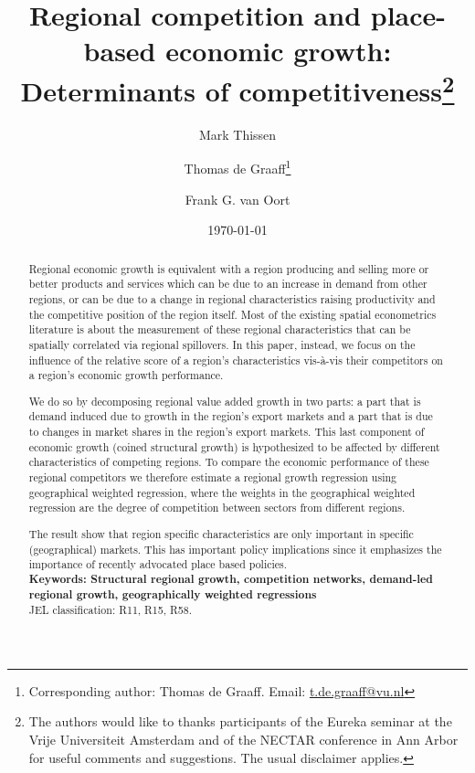 \documentclass[11pt,parskip,abstracton,notitlepage, paper=a4]{scrartcl}
\begin{document}
	
	\title{Regional competition and place-based economic growth: Determinants of competitiveness\thanks{The authors would like to thanks participants of the Eureka seminar at the Vrije Universiteit Amsterdam and of the NECTAR conference in Ann Arbor for useful comments and suggestions. The usual disclaimer applies.}}
		\author[1]{\normalsize Mark Thissen}
		\author[2]{\normalsize Thomas de Graaff\thanks{Corresponding author: Thomas de Graaff. Email: \url{t.de.graaff@vu.nl}}}
		\author[3]{\normalsize Frank G. van Oort}
		\date{\normalsize\today}
		\maketitle
		\clearpage
		\begin{abstract}
			\noindent
				Regional economic growth is equivalent with a region producing and selling more or better products and services which can be due to an increase in demand from other regions, or can be due to a change in regional characteristics raising productivity and the competitive position of the region itself. Most of the existing spatial econometrics literature is about the measurement of these regional characteristics that can be spatially correlated via regional spillovers. In this paper, instead, we focus on the influence of the relative score of a region's characteristics vis-\`{a}-vis their competitors on a region's economic growth performance.
				
				We do so by decomposing regional value added growth in two parts: a part that is demand induced due to growth in the region's export markets and a part that is due to changes in market shares in the region's export markets. This last component of economic growth (coined structural growth) is hypothesized to be affected by different characteristics of competing regions. To compare the economic performance of these regional competitors we therefore estimate a regional growth regression using geographical weighted regression, where the weights in the geographical weighted regression are the degree of competition between sectors from different regions. 
				
				The result show that region specific characteristics are only important in specific (geographical) markets. This has important policy implications since it emphasizes the importance of recently advocated place based policies. 
				 \\
			\newline
			{\small \textbf{Keywords: Structural regional growth, competition networks, demand-led regional growth, geographically weighted regressions}}\\
			{\small JEL classification: R11, R15, R58.}
		\end{abstract}
		\clearpage
\end{document}
